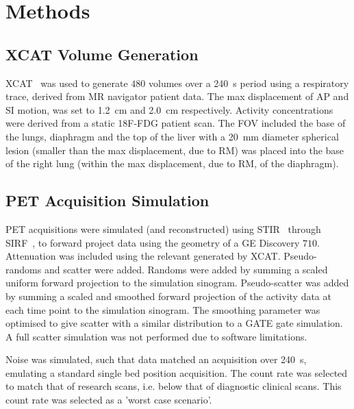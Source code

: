 
\section{Methods} \label{sec:methods}
    \subsection{XCAT Volume Generation} \label{sec:xcat_volume_generation}
        \gls{XCAT}~\cite{Segars2010} was used to generate $480$ volumes over a \SI{240}{\second} period using a respiratory trace, derived from \gls{MR} navigator patient data. The max displacement of \gls{AP} and \gls{SI} motion, was set to \SI{1.2}{\centi\metre} and \SI{2.0}{\centi\metre} respectively. Activity concentrations were derived from a static \gls{18F-FDG} patient scan. The \gls{FOV} included the base of the lungs, diaphragm and the top of the liver with a \SI{20}{\milli\metre} diameter spherical lesion (smaller than the max displacement, due to \gls{RM}) was placed into the base of the right lung (within the max displacement, due to \gls{RM}, of the diaphragm).
    
    
    \subsection{PET Acquisition Simulation} \label{sec:pet_acquisition_simulation}
        \gls{PET} acquisitions were simulated (and reconstructed) using \gls{STIR}~\cite{Thielemans2012, Nikos2019} through \gls{SIRF}~\cite{Ovtchinnikov2017}, to forward project data using the geometry of a \gls{GE} Discovery $710$. Attenuation was included using the relevant  generated by \gls{XCAT}. Pseudo-randoms and scatter were added. Randoms were added by summing a scaled uniform forward projection to the simulation sinogram. Pseudo-scatter was added by summing a scaled and smoothed forward projection of the activity data at each time point to the simulation sinogram. The smoothing parameter was optimised to give scatter with a similar distribution to a GATE gate simulation. A full scatter simulation was not performed due to software limitations.
        
        Noise was simulated, such that data matched an acquisition over \SI{240}{\second}, emulating a standard single bed position acquisition. The count rate was selected to match that of research scans, i.e. below that of diagnostic clinical scans. This count rate was selected as a 'worst case scenario'.
        
